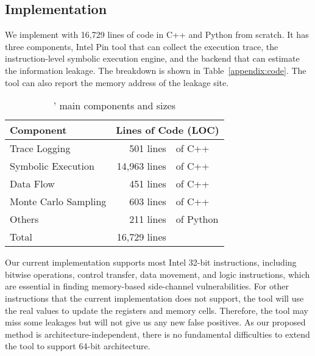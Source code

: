 \subsection{Implementation}
We implement \tool{} with 16,729 lines of code in C++ and Python from scratch. It has three
components, Intel Pin tool that can collect the execution trace, the
instruction-level symbolic execution engine, and the backend that can estimate
the information leakage. The breakdown is shown in
Table~\ref{appendix:code}. 
The tool can also report the memory address of
the leakage site. 

\label{appendix:code}
\begin{table}[h!]
    \centering
    \caption{\tool{}' main components and sizes}\label{tbl:implementation}
    \begin{tabular}{lr@{~}@{}l}
        \hline
        Component            & \multicolumn{2}{c}{Lines of Code (LOC)}             \\ \hline
        Trace Logging        & 501 lines                               & of C++    \\
        Symbolic Execution   & 14,963 lines                            & of C++    \\
        Data Flow            & 451 lines                               & of C++    \\
        Monte Carlo Sampling & 603 lines                               & of C++    \\
        Others               & 211 lines                               & of Python \\ \hline
        Total                & 16,729 lines                            &           \\\hline
    \end{tabular}
\end{table}

Our current implementation supports most Intel 32-bit instructions,
including bitwise operations, control transfer, data movement, and logic
instructions, which are essential in finding memory-based side-channel
vulnerabilities. For other instructions that the current implementation does not
support, the tool will use the real values to update the registers and memory
cells. Therefore, the tool may miss some leakages but will not give us any new
false positives. As our proposed method is architecture-independent,
there is no fundamental difficulties to extend the tool to support 64-bit
architecture. 
